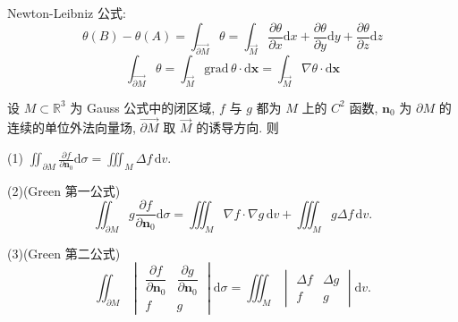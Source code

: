 \begin{theorem}
Newton-Leibniz 公式:
\[
\theta(B)-\theta(A)=\int_{\overrightarrow{\partial M}}\theta=\int_{\overrightarrow{M}}\frac{\partial\theta}{\partial x}\mathrm{d}x+\frac{\partial\theta}{\partial y}\mathrm{d}y+\frac{\partial\theta}{\partial z}\mathrm{d}z
\]
\[
\int_{\overrightarrow{\partial M}}\theta=\int_{\overrightarrow{M}}\mathrm{grad}\,\theta\cdot\mathrm{d}\boldsymbol{x}=\int_{\overrightarrow{M}}\nabla\theta\cdot\mathrm{d}\boldsymbol{x}
\]
\end{theorem}

\begin{theorem}\label{thm:11.6.2}
设 $M\subset\mathbb{R}^{3}$ 为 Gauss 公式中的闭区域, $f$ 与 $g$ 都为 $M$ 上的 $C^{2}$ 函数, $\boldsymbol{n}_{0}$ 为 $\partial M$ 的连续的单位外法向量场, $\overrightarrow{\partial M}$ 取 $\overrightarrow{M}$ 的诱导方向. 则

(1) $\displaystyle\iint_{\partial M}\frac{\partial f}{\partial\boldsymbol{n}_{0}}\mathrm{d}\sigma=\iiint_{M}\Delta f\,\mathrm{d}v$.

(2)(Green 第一公式)
\[
\iint_{\partial M}g\frac{\partial f}{\partial\boldsymbol{n}_{0}}\mathrm{d}\sigma=\iiint_{M}\nabla f\cdot\nabla g\,\mathrm{d}v+\iiint_{M}g\Delta f\,\mathrm{d}v.
\]

(3)(Green 第二公式)
\[
\iint_{\partial M}\begin{vmatrix}\dfrac{\partial f}{\partial\boldsymbol{n}_{0}}&\dfrac{\partial g}{\partial\boldsymbol{n}_{0}}\\ f&g\end{vmatrix}\mathrm{d}\sigma=\iiint_{M}\begin{vmatrix}\Delta f&\Delta g\\ f&g\end{vmatrix}\mathrm{d}v.
\]
\end{theorem}

